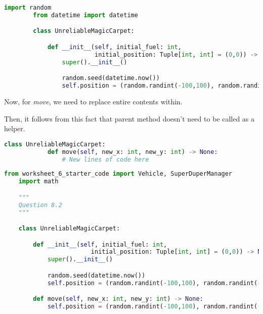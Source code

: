 \documentclass[12pt]{article}
\begin{document}
\begin{itemize}
\begin{enumerate}[a.]
        \begin{lstlisting}[language=Python]
        import random
        from datetime import datetime

        class UnreliableMagicCarpet:

            def __init__(self, initial_fuel: int,
                         initial_position: Tuple[int, int] = (0,0)) -> None:
                super().__init__()

                random.seed(datetime.now())
                self.position = (random.randint(-100,100), random.randint(-100,100))

        \end{lstlisting}

        Now, for \textit{move}, we need to replace entire contents within.

        \bigskip

        Then, it follows from this fact that parent method doesn't need to be
        called as a helper.

        \bigskip

        \begin{lstlisting}[language=Python]
        class UnreliableMagicCarpet:
            def move(self, new_x: int, new_y: int) -> None:
                # New lines of code here

        \end{lstlisting}
    \end{enumerate}
\end{itemize}


\begin{lstlisting}[language=Python]
    from worksheet_6_starter_code import Vehicle, SuperDuperManager
    import math

    """
    Question 8.2
    """

    class UnreliableMagicCarpet:

        def __init__(self, initial_fuel: int,
                        initial_position: Tuple[int, int] = (0,0)) -> None:
            super().__init__()

            random.seed(datetime.now())
            self.position = (random.randint(-100,100), random.randint(-100,100))

        def move(self, new_x: int, new_y: int) -> None:
            self.position = (random.randint(-100,100), random.randint(-100,100))

\end{lstlisting}
\end{document}
